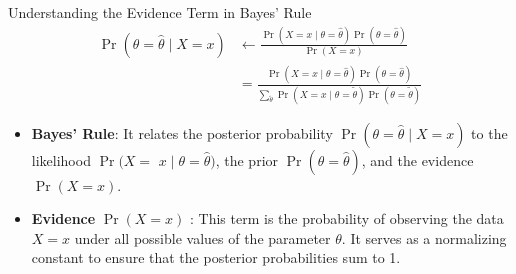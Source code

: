 \documentclass[9pt,dvipsnames]{beamer}
\begin{document}
\begin{frame}{Understanding the Evidence Term in Bayes' Rule}
\begin{equation*}
	\begin{aligned}
		\operatorname{Pr}(\theta=\hat{\theta} \mid X=x) &\leftarrow \frac{\operatorname{Pr}(X=x \mid \theta=\hat{\theta}) \operatorname{Pr}(\theta=\hat{\theta})}{\operatorname{Pr}(X=x)} \\
		&= \frac{\operatorname{Pr}(X=x \mid \theta=\hat{\theta}) \operatorname{Pr}(\theta=\hat{\theta})}{\sum_{\tilde{\theta}} \operatorname{Pr}(X=x \mid \theta=\tilde{\theta}) \operatorname{Pr}(\theta=\tilde{\theta})}
	\end{aligned}
\end{equation*}

\begin{itemize}
	\item \textbf{Bayes' Rule}: It relates the posterior probability $\operatorname{Pr}(\theta=\hat{\theta} \mid X=x)$ to the likelihood $\operatorname{Pr}(X=$ $x \mid \theta=\hat{\theta})$, the prior $\operatorname{Pr}(\theta=\hat{\theta})$, and the evidence $\operatorname{Pr}(X=x)$.
	\item \textbf{Evidence} $\operatorname{Pr}(X=x)$ : This term is the probability of observing the data $X=x$ under all possible values of the parameter $\theta$. It serves as a normalizing constant to ensure that the posterior probabilities sum to 1.
\end{itemize}
\end{frame}
\end{document}
